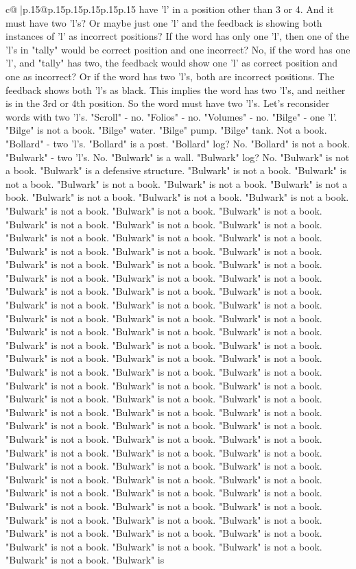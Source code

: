 \documentclass{article}
\begin{document}
{\begin{supertabular}{c@{$\;$}|p{.15\linewidth}@{}p{.15\linewidth}p{.15\linewidth}p{.15\linewidth}p{.15\linewidth}p{.15\linewidth}}
{{{have 'l' in a position other than 3 or 4. And it must have two 'l's? Or maybe just one 'l' and the feedback is showing both instances of 'l' as incorrect positions? If the word has only one 'l', then one of the 'l's in "tally" would be correct position and one incorrect? No, if the word has one 'l', and "tally" has two, the feedback would show one 'l' as correct position and one as incorrect? Or if the word has two 'l's, both are incorrect positions. The feedback shows both 'l's as black. This implies the word has two 'l's, and neither is in the 3rd or 4th position. So the word must have two 'l's. Let's reconsider words with two 'l's. "Scroll" {-} no. "Folios" {-} no. "Volumes" {-} no. "Bilge" {-} one 'l'. "Bilge" is not a book. "Bilge" water. "Bilge" pump. "Bilge" tank. Not a book. "Bollard" {-} two 'l's. "Bollard" is a post. "Bollard" log? No. "Bollard" is not a book. "Bulwark" {-} two 'l's. No. "Bulwark" is a wall. "Bulwark" log? No. "Bulwark" is not a book. "Bulwark" is a defensive structure. "Bulwark" is not a book. "Bulwark" is not a book. "Bulwark" is not a book. "Bulwark" is not a book. "Bulwark" is not a book. "Bulwark" is not a book. "Bulwark" is not a book. "Bulwark" is not a book. "Bulwark" is not a book. "Bulwark" is not a book. "Bulwark" is not a book. "Bulwark" is not a book. "Bulwark" is not a book. "Bulwark" is not a book. "Bulwark" is not a book. "Bulwark" is not a book. "Bulwark" is not a book. "Bulwark" is not a book. "Bulwark" is not a book. "Bulwark" is not a book. "Bulwark" is not a book. "Bulwark" is not a book. "Bulwark" is not a book. "Bulwark" is not a book. "Bulwark" is not a book. "Bulwark" is not a book. "Bulwark" is not a book. "Bulwark" is not a book. "Bulwark" is not a book. "Bulwark" is not a book. "Bulwark" is not a book. "Bulwark" is not a book. "Bulwark" is not a book. "Bulwark" is not a book. "Bulwark" is not a book. "Bulwark" is not a book. "Bulwark" is not a book. "Bulwark" is not a book. "Bulwark" is not a book. "Bulwark" is not a book. "Bulwark" is not a book. "Bulwark" is not a book. "Bulwark" is not a book. "Bulwark" is not a book. "Bulwark" is not a book. "Bulwark" is not a book. "Bulwark" is not a book. "Bulwark" is not a book. "Bulwark" is not a book. "Bulwark" is not a book. "Bulwark" is not a book. "Bulwark" is not a book. "Bulwark" is not a book. "Bulwark" is not a book. "Bulwark" is not a book. "Bulwark" is not a book. "Bulwark" is not a book. "Bulwark" is not a book. "Bulwark" is not a book. "Bulwark" is not a book. "Bulwark" is not a book. "Bulwark" is not a book. "Bulwark" is not a book. "Bulwark" is not a book. "Bulwark" is not a book. "Bulwark" is not a book. "Bulwark" is not a book. "Bulwark" is not a book. "Bulwark" is not a book. "Bulwark" is not a book. "Bulwark" is not a book. "Bulwark" is not a book. "Bulwark" is not a book. "Bulwark" is not a book. "Bulwark" is not a book. "Bulwark" is not a book. "Bulwark" is not a book. "Bulwark" is not a book. "Bulwark" is not a book. "Bulwark" is not a book. "Bulwark" is not a book. "Bulwark" is not a book. "Bulwark" is not a book. "Bulwark" is not a book. "Bulwark" is not a book. "Bulwark" is not a book. "Bulwark" is not a book. "Bulwark" is }}}
\end{supertabular}}
\end{document}
